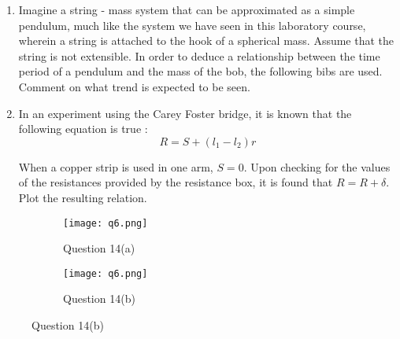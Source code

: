\begin{enumerate}
\begin{figure}[!htb]
\centering \hfill
\begin{subfigure}[b]{0.5\textwidth}
\centering
\texttt{[image: q3.png]}
\end{subfigure}\hfill
\begin{subfigure}[b]{0.5\textwidth}
\centering
\texttt{[image: q4.png]}
\end{subfigure}%
\hfill
\caption{Question 14 | Sketch the IV Characteristics}
\label{IVChar}
\end{figure}

\item Imagine a string - mass system that can be approximated as a simple pendulum, much like the system we have seen in this laboratory course, wherein a string is attached to the hook of a spherical mass. Assume that the string is not extensible. In order to deduce a relationship between the time period of a pendulum and the mass of the bob, the following bibs are used. Comment on what trend is expected to be seen. 

\item In an experiment using the Carey Foster bridge, it is known that the following equation is true :
$$ R = S + (l_1 - l_2)r $$

When a copper strip is used in one arm, $S=0$. Upon checking for the values of the resistances provided by the resistance box, it is found that $R = R + \delta$. Plot the resulting relation. 



\end{enumerate}

\begin{figure}[!htb]
\centering
\begin{subfigure}[b]{\textwidth}
\centering
\texttt{[image: q6.png]}
\caption{Question 14(a)}
\end{subfigure}
\begin{subfigure}[b]{\textwidth}
\centering
\texttt{[image: q6.png]}
\caption{Question 14(b)}
\end{subfigure}
\end{figure}

\newpage